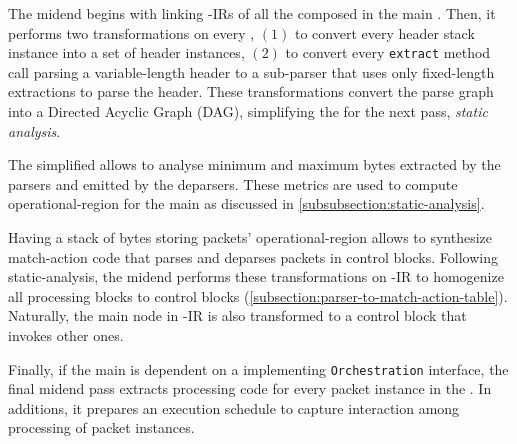 \documentclass[letterpaper,twocolumn,10pt]{article}
\begin{document}
The midend begins with linking \ucomp-IRs of all the \uprograms 
composed in the main \uprogram. Then, it performs two transformations 
on every \uprogram, $(1)$ to convert every header stack instance into 
a set of header instances, $(2)$ to convert every \texttt{extract} 
method call parsing a variable-length header to a sub-parser that 
uses only fixed-length extractions to parse the header. These 
transformations convert the parse graph into a Directed Acyclic Graph 
(DAG), simplifying the \uprograms for the next pass, \emph{static 
analysis}.


The simplified \uprograms allows to analyse minimum and 
maximum bytes extracted by the parsers and emitted by the deparsers. 
These metrics are used to compute operational-region for 
the main \uprogram as discussed in 
\cref{subsubsection:static-analysis}.

Having a stack of bytes storing packets' operational-region allows 
to synthesize match-action code that parses and deparses packets in 
control blocks. Following static-analysis, the midend performs these 
transformations on \ucomp-IR to homogenize all processing blocks to 
control blocks (\cref{subsection:parser-to-match-action-table}).
Naturally, the main \uprogram node in \ucomp-IR is also transformed 
to a control block that invokes other ones.

Finally, if the main \uprogram is dependent on a \uprogram 
implementing \texttt{Orchestration} interface, the final midend pass 
extracts processing code for every packet instance in the \uprogram. 
In additions, it prepares an execution schedule to capture 
interaction among processing of packet instances.




\end{document}
